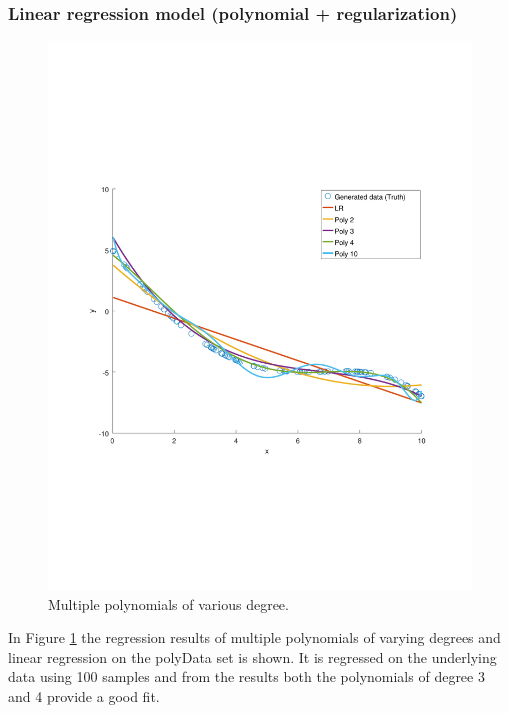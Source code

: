 \documentclass[]{article}
\begin{document}
\subsubsection{Linear regression model (polynomial + regularization)}

\begin{figure}[ht]
	\centering
	\includegraphics[trim= 10cm 5cm 10cm 5cm, scale=0.4]{proj1-3_2b-multipoly}
	\caption{Multiple polynomials of various degree.}
	\label{fig:multipoly}
\end{figure}
In Figure \ref{fig:multipoly} the regression results of multiple polynomials of varying degrees and linear regression on the polyData set is shown. It
is regressed on the underlying data using 100 samples and from the results both the polynomials of degree 3 and 4 provide a good fit.
\end{document}
